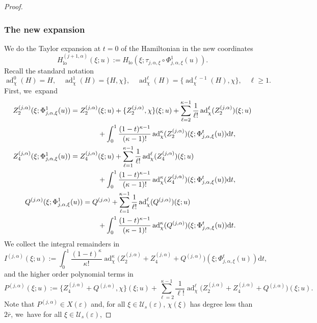 \documentclass[JEP,XML,SOM,Unicode,published]{cedram}
\theoremstyle{plain}
\theoremstyle{definition}
\DeclareMathOperator{\lo}{lo}
\newcommand{\1}{\mathbf{1}}
\let\epsilon\varepsilon
\begin{document}
\begin{proof}
\subsubsection*{The new expansion} We do the Taylor expansion at $t=0$ of the Hamiltonian
in the new coordinates
\[
H_{\lo}^{(j+1,\alpha)}(\xi;u):=H_{\lo}(\xi;\tau_{j,\alpha,\xi}\circ\Phi_{j,\alpha,\xi}^{1}(u)).
\]
Recall the standard notation
\[
\operatorname{ad}_{\chi}^{0}(H)=H,\quad \operatorname{ad}^{1}_{\chi}(H) = \{H,\chi\},\quad \operatorname{ad}^{\ell}_{\chi}(H) = \{\operatorname{ad}_{\chi}^{\ell-1}(H),\chi\},\quad \ell\geq1.
\]
First, we~expand
\begin{align}
\label{eq:exp2}
Z_{2}^{(j,\alpha)}(\xi;\Phi_{j,\alpha,\xi}^{1}(u))
= Z_{2}^{(j,\alpha)}&(\xi;u) + \{Z_{2}^{(j,\alpha)},\chi\}(\xi;u) + \sum_{\ell=2}^{\kappa-1}\frac{1}{\ell!}\operatorname{ad}_{\chi}^{\ell}(Z_{2}^{(j,\alpha)})(\xi;u)\\
&+ \int_{0}^{1}\frac{(1-t)^{\kappa-1}}{(\kappa-1)!}\operatorname{ad}_{\chi}^{\kappa}(Z_{2}^{(j,\alpha)})(\xi;\Phi_{j,\alpha,\xi}^{t}(u))\mathrm{d}t,\notag
\\
\label{eq:exp4}
Z_{4}^{(j,\alpha)}(\xi;\Phi_{j,\alpha,\xi}^{1}(u))
= Z_{4}^{(j,\alpha)}&(\xi;u) + \sum_{\ell=1}^{\kappa-1}\frac{1}{\ell!}\operatorname{ad}_{\chi}^{\ell}(Z_{4}^{(j,\alpha)})(\xi;u)\\
&+ \int_{0}^{1}\frac{(1-t)^{\kappa-1}}{(\kappa-1)!}\operatorname{ad}_{\chi}^{\kappa}(Z_{4}^{(j,\alpha)})(\xi;\Phi_{j,\alpha,\xi}^{t}(u))\mathrm{d}t,\notag
\\
\label{eq:expQ}
Q^{(j,\alpha)}(\xi;\Phi_{j,\alpha,\xi}^{1}(u))
= Q&^{(j,\alpha)} + \sum_{\ell=1}^{\kappa-1}\frac{1}{\ell!}\operatorname{ad}_{\chi}^{\ell}(Q^{(j,\alpha)})(\xi;u) \\
&+ \int_{0}^{1}\frac{(1-t)^{\kappa-1}}{(\kappa-1)!}\operatorname{ad}_{\chi}^{\kappa}(Q^{(j,\alpha)})(\xi;\Phi_{j,\alpha,\xi}^{t}(u))\mathrm{d}t.\notag
\end{align}
We collect the integral remainders in
\[
I^{(j,\alpha)}(\xi;u) := \int_{0}^{1}\frac{(1-t)^{\kappa}}{\kappa!}\operatorname{ad}_{\chi}^{\kappa}\big(Z_{2}^{(j,\alpha)} + Z_{4}^{(j,\alpha)}+ Q^{(j,\alpha)}\big)(\xi;\Phi_{j,\alpha,\xi}^{t}(u))\mathrm{d}t,
\]
and the higher order polynomial terms in
\[
P^{(j,\alpha)}(\xi;u) := \{Z_{4}^{(j,\alpha)}+Q^{(j,\alpha)},\chi\}(\xi;u)
+ \sum_{\ell=2}^{\kappa-1}\frac{1}{\ell!}\operatorname{ad}_{\chi}^{\ell}\big(Z_{2}^{(j,\alpha)}+Z_{4}^{(j,\alpha)}+Q^{(j,\alpha)}\big)(\xi;u).
\]
Note that $P^{(j,\alpha)}\in X(\epsilon)$ and, for all $\xi\in\mathcal{U}_{s}(\epsilon)$, $\chi(\xi)$ has degree less than $2\overline{r}$, we~have for all $\xi\in\mathcal{U}_{s}(\epsilon)$,

\end{proof}
\end{document}
